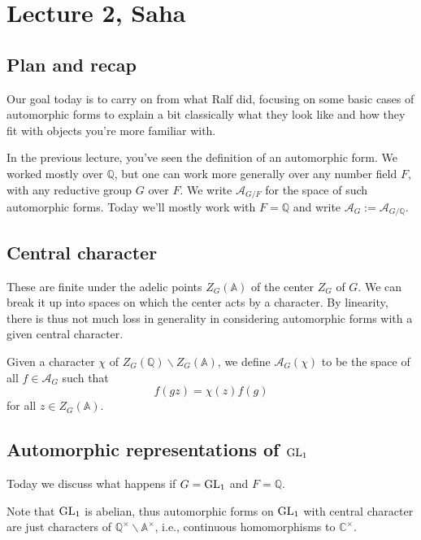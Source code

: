 \documentclass[reqno]{amsart} 
\begin{document}
\section{Lecture 2, Saha}

\subsection{Plan and recap}

Our goal today is to carry on from what Ralf did, focusing on some basic cases of automorphic forms to explain a bit classically what they look like and how they fit with objects you're more familiar with.

In the previous lecture, you've seen the definition of an automorphic form.  We worked mostly over $\mathbb{Q}$, but one can work more generally over any number field $F$, with any reductive group $G$ over $F$.  We write $\mathcal{A}_{G/F}$ for the space of such automorphic forms.  Today we'll mostly work with $F = \mathbb{Q}$ and write $\mathcal{A}_G := \mathcal{A}_{G/\mathbb{Q}}$.

\subsection{Central character}

These are finite under the adelic points $Z_G(\mathbb{A})$ of the center $Z_G$ of $G$.  We can break it up into spaces on which the center acts by a character.  By linearity, there is thus not much loss in generality in considering automorphic forms with a given central character.

Given a character $\chi$ of $Z_G(\mathbb{Q}) \backslash Z_G(\mathbb{A})$, we define $\mathcal{A}_G(\chi)$ to be the space of all $f \in \mathcal{A}_G$ such that
\begin{equation*}
  f(g z) = \chi(z) f(g)
\end{equation*}
for all $z \in Z_G(\mathbb{A})$.

\subsection{Automorphic representations of $\operatorname{GL}_1$}

Today we discuss what happens if $G = \operatorname{GL}_1$ and $F = \mathbb{Q}$.

Note that $\operatorname{GL}_1$ is abelian, thus automorphic forms on $\operatorname{GL}_1$ with central character are just characters of $\mathbb{Q}^\times \backslash \mathbb{A}^\times$, i.e., continuous homomorphisms to $\mathbb{C}^\times$.
\end{document}
